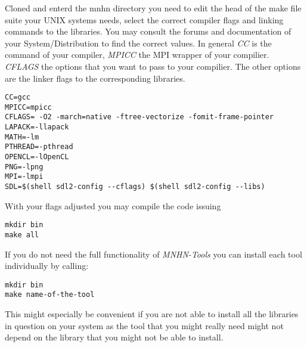 Cloned and enterd the mnhn directory you need to edit the head of the
make file suite your UNIX systems needs, select the correct compiler
flags and linking commands to the libraries. You may consult the
forums and documentation of your System/Distribution to find the
correct values. In general \emph{CC} is the command of your compiler,
\emph{MPICC} the MPI wrapper of your compilier. \emph{CFLAGS} the
options that you want to pass to your compilier. The other options are
the linker flags to the corresponding libraries.
\begin{lstlisting}                                                           
CC=gcc
MPICC=mpicc
CFLAGS= -O2 -march=native -ftree-vectorize -fomit-frame-pointer 
LAPACK=-llapack
MATH=-lm
PTHREAD=-pthread
OPENCL=-lOpenCL
PNG=-lpng
MPI=-lmpi
SDL=$(shell sdl2-config --cflags) $(shell sdl2-config --libs)
\end{lstlisting}
With your flags adjusted you may compile the code issuing
\begin{lstlisting}
mkdir bin
make all
\end{lstlisting}
If you do not need the full functionality of \emph{MNHN-Tools} you can
install each tool individually by calling:
\begin{lstlisting}
mkdir bin
make name-of-the-tool
\end{lstlisting}
This might especially be convenient if you are not able to install all
the libraries in question on your system as the tool that you might
really need might not depend on the library that you might not be able
to install.
